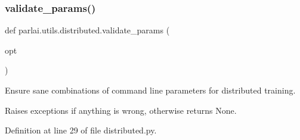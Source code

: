 \mbox{\label{namespaceparlai_1_1utils_1_1distributed_afd854992e4cc6571b120b9e179cd4a7a}} 
\subsubsection{\texorpdfstring{validate\+\_\+params()}{validate\_params()}}
{\footnotesize\ttfamily def parlai.\+utils.\+distributed.\+validate\+\_\+params (\begin{DoxyParamCaption}\item[{}]{opt }\end{DoxyParamCaption})}

\begin{DoxyVerb}Ensure sane combinations of command line parameters for distributed training.

Raises exceptions if anything is wrong, otherwise returns None.
\end{DoxyVerb}
 

Definition at line 29 of file distributed.\+py.


